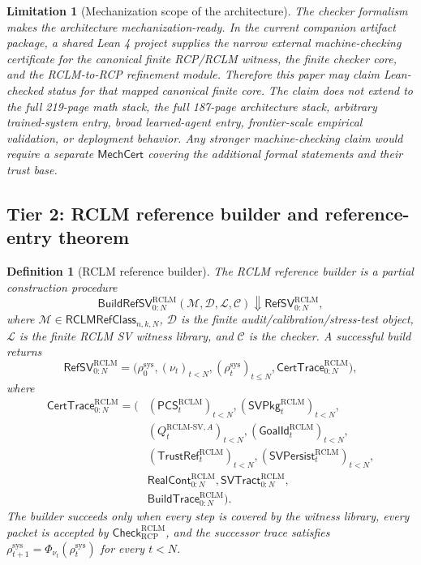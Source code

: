 \documentclass[11pt,a4paper]{article}
\newtheorem{definition}[theorem]{Definition}
\newtheorem{limitation}[theorem]{Limitation}
\newcommand{\RCP}{\mathrm{RCP}}
\newcommand{\RCLM}{\mathrm{RCLM}}
\newcommand{\sys}{\mathrm{sys}}
\begin{document}
\begin{limitation}[Mechanization scope of the architecture]
\label{lim:rclm-batch13r-mechanization-ready-not-machine-checked}
The checker formalism makes the architecture mechanization-ready.  In the current companion artifact package, a shared Lean 4 project supplies the narrow external machine-checking certificate for the canonical finite RCP/RCLM witness, the finite checker core, and the RCLM-to-RCP refinement module.  Therefore this paper may claim Lean-checked status for that mapped canonical finite core.  The claim does not extend to the full 219-page math stack, the full 187-page architecture stack, arbitrary trained-system entry, broad learned-agent entry, frontier-scale empirical validation, or deployment behavior.  Any stronger machine-checking claim would require a separate \(\mathsf{MechCert}\) covering the additional formal statements and their trust base.
\end{limitation}

\subsection{Tier 2: RCLM reference builder and reference-entry theorem}

\begin{definition}[RCLM reference builder]
\label{def:rclm-batch13r-build-refsv}
The RCLM reference builder is a partial construction procedure
\[
\mathsf{BuildRefSV}_{0:N}^{\RCLM}(\mathcal M,\mathcal D,\mathcal L,\mathcal C)
\Downarrow
\mathsf{RefSV}_{0:N}^{\RCLM},
\]
where \(\mathcal M\in\mathsf{RCLMRefClass}_{n,k,N}\), \(\mathcal D\) is the finite audit/calibration/stress-test object, \(\mathcal L\) is the finite RCLM SV witness library, and \(\mathcal C\) is the checker.  A successful build returns
\[
\mathsf{RefSV}_{0:N}^{\RCLM}
=
\bigl(
\rho_0^{\sys},(\nu_t)_{t<N},(\rho_t^{\sys})_{t\le N},
\mathsf{CertTrace}_{0:N}^{\RCLM}\bigr),
\]
where
\[
\begin{aligned}
\mathsf{CertTrace}_{0:N}^{\RCLM}=(&
(\mathsf{PCS}_t^{\RCLM})_{t<N},
(\mathsf{SVPkg}_t^{\RCLM})_{t<N},\\
&(Q_t^{\RCLM\text{-}\mathrm{SV},A})_{t<N},
(\mathsf{GoalId}_t^{\RCLM})_{t<N},\\
&(\mathsf{TrustRef}_t^{\RCLM})_{t<N},
(\mathsf{SVPersist}_t^{\RCLM})_{t<N},\\
&\mathsf{RealCont}_{0:N}^{\RCLM},
\mathsf{SVTract}_{0:N}^{\RCLM},\\
&\mathsf{BuildTrace}_{0:N}^{\RCLM}).
\end{aligned}
\]
The builder succeeds only when every step is covered by the witness library, every packet is accepted by \(\mathsf{Check}_{\RCP}^{\RCLM}\), and the successor trace satisfies \(\rho_{t+1}^{\sys}=\Phi_{\nu_t}(\rho_t^{\sys})\) for every \(t<N\).
\end{definition}
\end{document}
